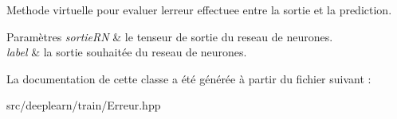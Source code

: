 Methode virtuelle pour evaluer l\textquotesingle{}erreur effectuee entre la sortie et la prediction. 


\begin{DoxyParams}{Paramètres}
{\em sortie\+RN} & le tenseur de sortie du reseau de neurones. \\
\hline
{\em label} & la sortie souhaitée du reseau de neurones. \\
\hline
\end{DoxyParams}


La documentation de cette classe a été générée à partir du fichier suivant \+:\begin{DoxyCompactItemize}
\item 
src/deeplearn/train/Erreur.\+hpp\end{DoxyCompactItemize}

